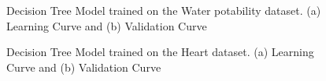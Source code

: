\documentclass[
	letterpaper, %
]{mlreport}
\begin{document}
\begin{figure}
	\centering
	\caption{Decision Tree Model trained on the Water potability dataset. (a) Learning Curve and (b) Validation Curve}
	\label{fig:fig3}
\end{figure}
\begin{figure}
	\centering
	\caption{Decision Tree Model trained on the Heart dataset. (a) Learning Curve and (b) Validation Curve}
	\label{fig:fig4}
\end{figure}
\end{document}
